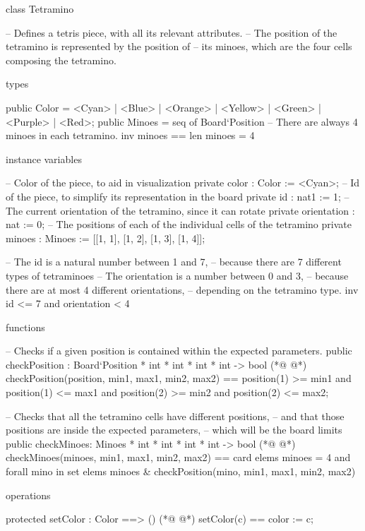 \begin{vdmpp}[breaklines=true]
class Tetramino

 -- Defines a tetris piece, with all its relevant attributes.
 -- The position of the tetramino is represented by the position of 
 -- its minoes, which are the four cells composing the tetramino.


 types

  public Color = <Cyan> | <Blue> | <Orange> 
   | <Yellow> | <Green> | <Purple> | <Red>;
  public Minoes = seq of Board`Position
  -- There are always 4 minoes in each tetramino.
  inv minoes == len minoes = 4 


 instance variables
 
  -- Color of the piece, to aid in visualization
  private color  : Color  := <Cyan>;
  -- Id of the piece, to simplify its representation in the board
  private id   : nat1   := 1;
  -- The current orientation of the tetramino, since it can rotate
  private orientation : nat   := 0;
  -- The positions of each of the individual cells of the tetramino
  private minoes  : Minoes := [[1, 1], [1, 2], [1, 3], [1, 4]];
 
  -- The id is a natural number between 1 and 7,
  -- because there are 7 different types of tetraminoes
  -- The orientation is a number between 0 and 3,
  -- because there are at most 4 different orientations,
  -- depending on the tetramino type.
  inv id <= 7 and orientation < 4
  
 
 functions
 
  -- Checks if a given position is contained within the expected parameters.
  public checkPosition : Board`Position * int * int * int * int -> bool
(*@
\label{checkPosition:40}
@*)
  checkPosition(position, min1, max1, min2, max2) == 
   position(1) >= min1
   and position(1) <= max1 
   and position(2) >= min2
   and position(2) <= max2;
  
  -- Checks that all the tetramino cells have different positions,
  -- and that those positions are inside the expected parameters,
  -- which will be the board limits 
  public checkMinoes: Minoes * int * int * int * int -> bool
(*@
\label{checkMinoes:50}
@*)
  checkMinoes(minoes, min1, max1, min2, max2) ==
   card elems minoes = 4 
   and forall mino in set elems minoes & 
    checkPosition(mino, min1, max1, min2, max2)
 
 
 operations
  
  protected setColor : Color ==> ()
(*@
\label{setColor:59}
@*)
  setColor(c) == color := c;
  

\end{vdmpp}
